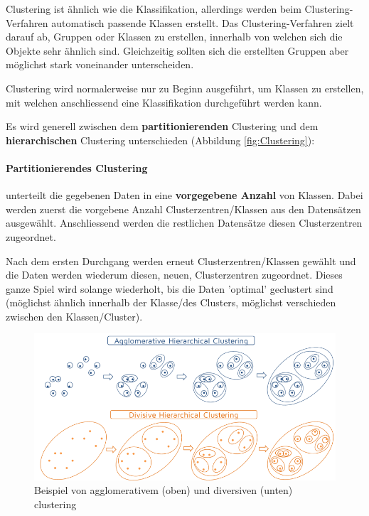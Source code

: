 \documentclass[a4paper, 11pt, nofootinbib]{article}
\begin{document}
 Clustering ist ähnlich wie die Klassifikation, allerdings werden beim Clustering-Verfahren automatisch passende Klassen erstellt. Das Clustering-Verfahren zielt darauf ab, Gruppen oder Klassen zu erstellen, innerhalb von welchen sich die Objekte sehr ähnlich sind. Gleichzeitig sollten sich die erstellten Gruppen aber möglichst stark voneinander unterscheiden.
 
 Clustering wird normalerweise nur zu Beginn ausgeführt, um Klassen zu erstellen, mit welchen anschliessend eine Klassifikation durchgeführt werden kann.
 
 \vspace{10px}
 
 \noindent Es wird generell zwischen dem \textbf{partitionierenden} Clustering und dem \textbf{hierarchischen} Clustering unterschieden (Abbildung \ref{fig:Clustering}):
 
 \paragraph{Partitionierendes Clustering} unterteilt die gegebenen Daten in eine \textbf{vorgegebene Anzahl} von Klassen. Dabei werden zuerst die vorgebene Anzahl Clusterzentren/Klassen aus den Datensätzen ausgewählt. Anschliessend werden die restlichen Datensätze diesen Clusterzentren zugeordnet. 
 
 Nach dem ersten Durchgang werden erneut Clusterzentren/Klassen gewählt und die Daten werden wiederum diesen, neuen, Clusterzentren zugeordnet. Dieses ganze Spiel wird solange wiederholt, bis die Daten 'optimal' geclustert sind (möglichst ähnlich innerhalb der Klasse/des Clusters, möglichst verschieden zwischen den Klassen/Cluster).
 
   \begin{figure}[htb]
 	\centering
 	\includegraphics[keepaspectratio=true,height=12\baselineskip]{hierarchical_clustering.png}
 	\caption{Beispiel von agglomerativem (oben) und diversiven (unten) clustering}
 	\label{fig:hierCluster}
 \end{figure}
 
\end{document}
